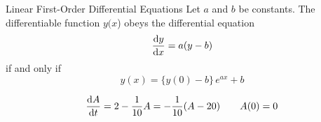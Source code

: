\begin{frame}[t]
\begin{block}{Linear First-Order Differential Equations}
Let $a$ and $b$ be constants.
The differentiable function $y(x$) obeys the differential equation
\begin{equation*}
\frac{\text{d}y}{\text{d}x} =a(y-b)
\end{equation*}
if and only if
\begin{equation*}
y(x) = \{y(0)-b\}\,e^{ax} + b
\end{equation*}
\end{block}

\[\frac{\text{d}A}{\text{d}t}=2-\frac{1}{10}A=-\frac{1}{10}(A-20)\qquad A(0)=0\]



\end{frame}


